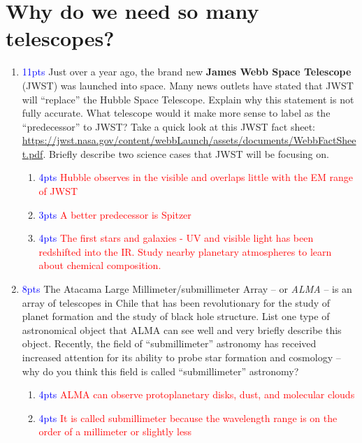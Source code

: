 \documentclass[11pt]{article}
\begin{document}
\section{Why do we need so many telescopes?}

\begin{enumerate}
    \item \textcolor{blue}{11pts} Just over a year ago, the brand new \textbf{James Webb Space Telescope} (JWST) was launched into space. Many news outlets have stated that JWST will ``replace'' the Hubble Space Telescope. Explain why this statement is not fully accurate. What telescope would it make more sense to label as the ``predecessor'' to JWST? Take a quick look at this JWST fact sheet: \url{https://jwst.nasa.gov/content/webbLaunch/assets/documents/WebbFactSheet.pdf}. Briefly describe two science cases that JWST will be focusing on.
    
    \begin{enumerate}
        \item \textcolor{blue}{4pts} \textcolor{red}{Hubble observes in the visible and overlaps little with the EM range of JWST}
        \item \textcolor{blue}{3pts} \textcolor{red}{A better predecessor is Spitzer}
        \item \textcolor{blue}{4pts} \textcolor{red}{The first stars and galaxies - UV and visible light has been redshifted into the IR.  Study nearby planetary atmospheres to learn about chemical composition.}
    \end{enumerate}
    
    
    \item \textcolor{blue}{8pts} The Atacama Large Millimeter/submillimeter Array -- or \emph{ALMA} -- is an array of telescopes in Chile that has been revolutionary for the study of planet formation and the study of black hole structure. List one type of astronomical object that ALMA can see well and very briefly describe this object. Recently, the field of ``submillimeter'' astronomy has received increased attention for its ability to probe star formation and cosmology -- why do you think this field is called ``submillimeter'' astronomy?
    
    \begin{enumerate}
        \item \textcolor{blue}{4pts} \textcolor{red}{ALMA can observe protoplanetary disks, dust, and molecular clouds}
        \item \textcolor{blue}{4pts} \textcolor{red}{It is called submillimeter because the wavelength range is on the order of a millimeter or slightly less}
    \end{enumerate}
    

\end{enumerate}
\end{document}
